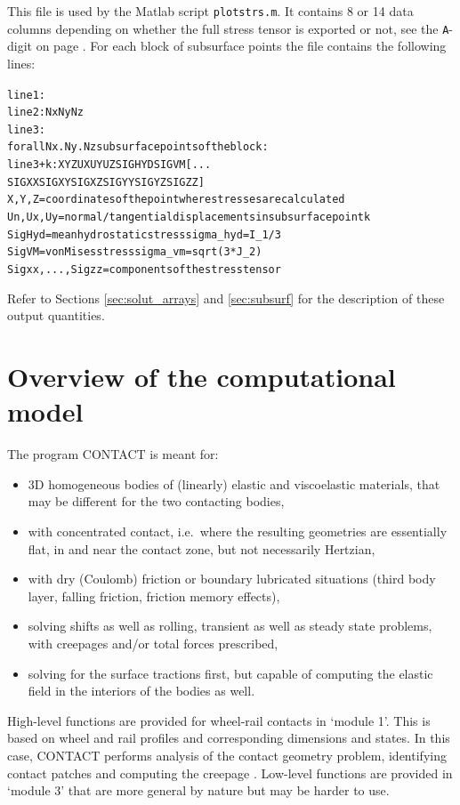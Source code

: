 \documentclass[12pt]{report}
\begin{document}
This file is used by the Matlab script {\tt plotstrs.m}. It contains 8
or 14 data columns depending on whether the full stress tensor is
exported or not, see the {\tt A}-digit on page \pageref{a-digit}. For each
block of subsurface points the file contains the following lines:
\begin{alltt}\small
  line 1: %
  line 2:   Nx  Ny  Nz
  line 3: %
  for all Nx.Ny.Nz subsurface points of the block:
     line 3+k:  X   Y   Z   UX   UY   UZ   SIGHYD  SIGVM [ ...
                                 SIGXX  SIGXY  SIGXZ  SIGYY SIGYZ  SIGZZ ]
  X,Y,Z    = coordinates of the point where stresses are calculated
  Un,Ux,Uy = normal/tangential displacements in subsurface point k
  SigHyd   = mean hydrostatic stress sigma_hyd = I_1/3
  SigVM    = von Mises stress sigma_vm = sqrt(3*J_2)
  Sigxx,...,Sigzz = components of the stress tensor
\end{alltt}
Refer to Sections \ref{sec:solut_arrays} and \ref{sec:subsurf} for the
description of these output quantities.


\chapter{Overview of the computational model}
\label{chp:comput_model}

The program CONTACT is meant for:
\begin{itemize}
\item 3D homogeneous bodies of (linearly) elastic and viscoelastic
        materials, that may be different for the two contacting bodies,
\item with concentrated contact, i.e.\ where the resulting geometries are
        essentially flat, in and near the contact zone, but not necessarily
        Hertzian,
\item with dry (Coulomb) friction or boundary lubricated situations
        (third body layer, falling friction, friction memory effects),
\item solving shifts as well as rolling, transient as well as steady state
        problems, with creepages and/or total forces prescribed,
\item solving for the surface tractions first, but capable of computing the
        elastic field in the interiors of the bodies as well.
\end{itemize}
High-level functions are provided for wheel-rail contacts in `module 1'.
This is based on wheel and rail profiles and corresponding dimensions and
states. In this case, CONTACT performs analysis of the contact geometry
problem, identifying contact patches and computing the creepage
\cite{Vollebregt2020c-distr-force,Vollebregt2020b-wrgeom}. Low-level
functions are provided in `module 3' that are more general by nature but
may be harder to use.
\end{document}
